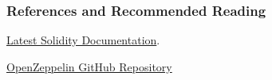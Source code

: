 \documentclass[handout]{beamer}
\begin{document}


\begin{frame}%
\frametitle{References and Recommended Reading}

 
\link \href{https://docs.soliditylang.org/en/latest/index.html}{Latest Solidity Documentation}.

\vspace{1em}

\link \href{https://github.com/OpenZeppelin/openzeppelin-contracts}{OpenZeppelin GitHub Repository}

\end{frame}
\end{document}
